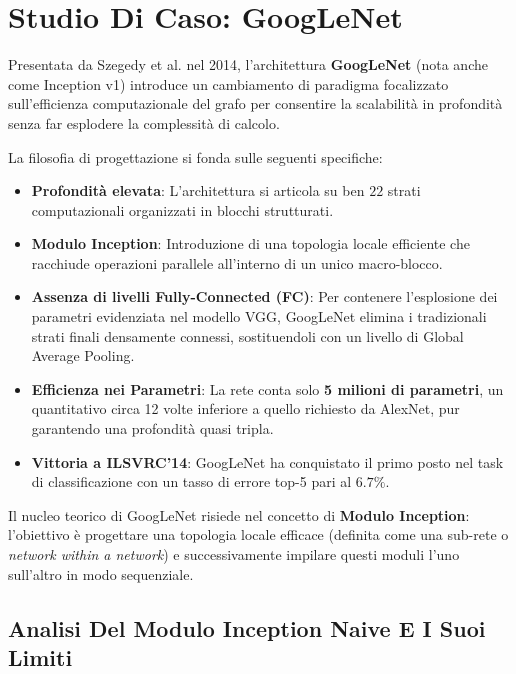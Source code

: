 ﻿\documentclass[11pt, a4paper]{article}
\begin{document}
\newpage

\section{Studio Di Caso: GoogLeNet}

Presentata da Szegedy et al. nel 2014, l'architettura \textbf{GoogLeNet} (nota anche come Inception v1) introduce un cambiamento di paradigma focalizzato sull'efficienza computazionale del grafo per consentire la scalabilità in profondità senza far esplodere la complessità di calcolo.


La filosofia di progettazione si fonda sulle seguenti specifiche:
\begin{itemize}
    \item \textbf{Profondità elevata}: L'architettura si articola su ben $22$ strati computazionali organizzati in blocchi strutturati.
    \item \textbf{Modulo Inception}: Introduzione di una topologia locale efficiente che racchiude operazioni parallele all'interno di un unico macro-blocco.
    \item \textbf{Assenza di livelli Fully-Connected (FC)}: Per contenere l'esplosione dei parametri evidenziata nel modello VGG, GoogLeNet elimina i tradizionali strati finali densamente connessi, sostituendoli con un livello di Global Average Pooling.
    \item \textbf{Efficienza nei Parametri}: La rete conta solo \textbf{5 milioni di parametri}, un quantitativo circa 12 volte inferiore a quello richiesto da AlexNet, pur garantendo una profondità quasi tripla.
    \item \textbf{Vittoria a ILSVRC'14}: GoogLeNet ha conquistato il primo posto nel task di classificazione con un tasso di errore top-5 pari al \textbf{$6.7\%$}.
\end{itemize}

Il nucleo teorico di GoogLeNet risiede nel concetto di \textbf{Modulo Inception}: l'obiettivo è progettare una topologia locale efficace (definita come una sub-rete o \emph{network within a network}) e successivamente impilare questi moduli l'uno sull'altro in modo sequenziale.

\subsection{Analisi Del Modulo Inception Naive E I Suoi Limiti}
\end{document}
